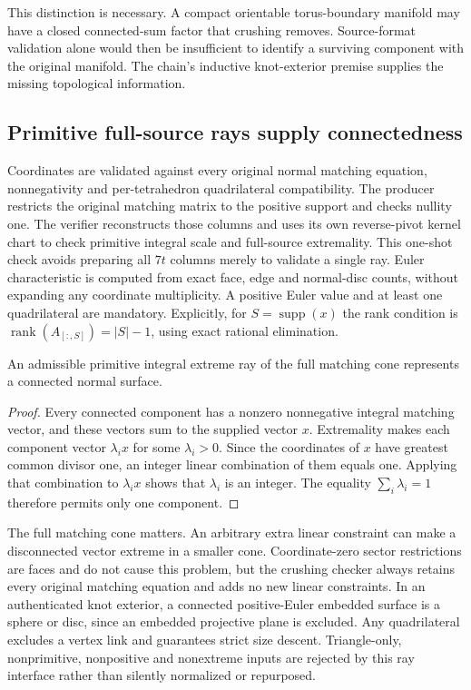 This distinction is necessary.  A compact orientable torus-boundary
manifold may have a closed connected-sum factor that crushing removes.
Source-format validation alone would then be insufficient to identify a
surviving component with the original manifold.  The chain's inductive
knot-exterior premise supplies the missing topological information.

\subsection{Primitive full-source rays supply connectedness}

Coordinates are validated against every original normal matching equation,
nonnegativity and per-tetrahedron quadrilateral compatibility.  The producer
restricts the original matching matrix to the positive support and checks
nullity one.  The verifier reconstructs those columns and uses its own
reverse-pivot kernel chart to check primitive integral scale and full-source
extremality.  This one-shot check avoids preparing all $7t$ columns merely
to validate a single ray.  Euler characteristic is computed from exact face,
edge and normal-disc counts, without expanding any coordinate multiplicity.
A positive Euler value and at least one quadrilateral are mandatory.
Explicitly, for $S=\operatorname{supp}(x)$ the rank condition is
$\operatorname{rank}(A_{[:,S]})=|S|-1$, using exact rational elimination.

\begin{lemma}
An admissible primitive integral extreme ray of the full matching cone
represents a connected normal surface.
\end{lemma}
\begin{proof}
Every connected component has a nonzero nonnegative integral matching
vector, and these vectors sum to the supplied vector $x$.  Extremality
makes each component vector $\lambda_i x$ for some $\lambda_i>0$.
Since the coordinates of $x$ have greatest common divisor one, an integer
linear combination of them equals one.  Applying that combination to
$\lambda_i x$ shows that $\lambda_i$ is an integer.  The equality
$\sum_i\lambda_i=1$ therefore permits only one component.
\end{proof}

The full matching cone matters.  An arbitrary extra linear constraint can
make a disconnected vector extreme in a smaller cone.  Coordinate-zero
sector restrictions are faces and do not cause this problem, but the
crushing checker always retains every original matching equation and adds
no new linear constraints.
In an authenticated knot exterior, a connected positive-Euler embedded
surface is a sphere or disc, since an embedded projective plane is excluded.
Any quadrilateral excludes a vertex link and guarantees strict size descent.
Triangle-only, nonprimitive, nonpositive and nonextreme inputs are rejected
by this ray interface rather than silently normalized or repurposed.


